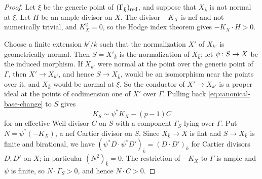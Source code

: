 \begin{proof}
Let $\xi$ be the generic point of $(\Gamma_{\bar k})_{\rm red}$, and suppose that $X_{\bar k}$ is not normal at $\xi$.
Let $H$ be an ample divisor on $X$.
The divisor $-K_X$ is nef and not numerically trivial, and $K_X^2 = 0$, so the Hodge index theorem gives $-K_X\cdot H>0$.

Choose a finite extension $k'/k$ such that the normalization $X'$ of $X_{k'}$ is geometrically normal.
Then $S = X'_{\bar k}$ is the normalization of $X_{\bar k}$; let $\psi\colon S\to X$ be the induced morphism.
If $X_{k'}$ were normal at the point over the generic point of $\Gamma$, then $X'\to X_{k'}$, and hence $S\to X_{\bar k}$, would be an isomorphism near the points over it, and $X_{\bar k}$ would be normal at $\xi$.
So the conductor of $X'\to X_{k'}$ is a proper ideal at the points of codimension one of $X'$ over $\Gamma$.
Pulling back \eqref{eq:canonical-base-change} to $S$ gives
\[
  K_S\sim\psi^*K_X-(p-1)C
\]
for an effective Weil divisor $C$ on $S$ with a component $\Gamma_S$ lying over $\Gamma$.
Put $N = \psi^*(-K_X)$, a nef Cartier divisor on $S$.
Since $X_{\bar k}\to X$ is flat and $S\to X_{\bar k}$ is finite and birational, we have $(\psi^*D\cdot\psi^*D')_{\bar k} = (D\cdot D')_k$ for Cartier divisors $D,D'$ on $X$; in particular $(N^2)_{\bar k} = 0$.
The restriction of $-K_X$ to $\Gamma$ is ample and $\psi$ is finite, so $N\cdot\Gamma_S>0$, and hence $N\cdot C>0$.


\end{proof}
